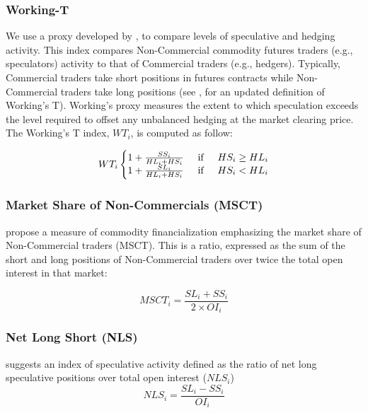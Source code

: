 \documentclass[12pt]{article}
\begin{document}
\subsubsection{Working-T}
We use a proxy developed by \citet{working1960speculation}, to compare levels of speculative and hedging activity. This index compares Non-Commercial commodity futures traders (e.g., speculators) activity to that of Commercial traders (e.g., hedgers). Typically, Commercial traders take short positions in futures contracts while Non-Commercial traders take long positions (see \citet{shanker2017new}, for an updated definition of Working’s T). Working’s proxy measures the extent to which speculation exceeds the level required to offset any unbalanced hedging at the market clearing price. The Working's T index, $WT_i$, is computed as follow:


\begin{equation} \label{eqn:Working}
WT_i\left\{\begin{matrix}
 1+\frac{SS_i}{HL_i+HS_i} \hspace{0.5cm} \mbox{if} \hspace{0.5cm} HS_i \ge HL_i\\
1+\frac{SL_i}{HL_i+HS_i} \hspace{0.5cm} \mbox{if} \hspace{0.5cm} HS_i < HL_i
\end{matrix}\right.
\end{equation}


\subsubsection{Market Share of Non-Commercials (MSCT)}
\citet{buyukcsahin2014speculators} propose a measure of commodity financialization emphasizing the market share of Non-Commercial traders (MSCT). This  is a ratio, expressed as  the sum of the short and long positions of Non-Commercial traders over twice the total open interest in that market: 



\begin{equation} \label{eqn:MSCT}
MSCT_i=\frac{SL_i+SS_i}{2 \times OI_i}
\end{equation}

\subsubsection{Net Long Short (NLS)}
\citet{hedegaard2011margins} suggests an index of speculative activity defined as the ratio of net long speculative positions over total open interest ($NLS_i$)
\begin{equation} \label{eqn:NLS}
NLS_i=\frac{SL_i-SS_i}{OI_i}
\end{equation}
\end{document}
